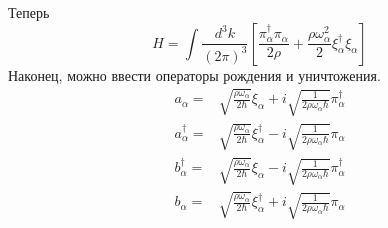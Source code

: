 \documentclass{article}
\begin{document}
Теперь
\begin{equation}
    H = \int \frac{d^3 k}{(2\pi)^3} \left[ \frac{\pi_\alpha^\dagger \pi_\alpha}{2\rho} + 
                         \frac{\rho \omega_\alpha^2}{2} \xi_\alpha^\dagger \xi_\alpha
                                        \right]
\end{equation}
Наконец, можно ввести операторы рождения и уничтожения.
\begin{equation}
    \begin{split}
        a_{\alpha} = & \sqrt{\frac{\rho \omega_\alpha}{2\hbar}}\xi_\alpha + 
                        i\sqrt{\frac{1}{2\rho\omega_\alpha \hbar}}\pi_\alpha^\dagger\\
        a_{\alpha}^\dagger = & \sqrt{\frac{\rho \omega_\alpha}{2\hbar}}\xi_\alpha^\dagger - 
                        i\sqrt{\frac{1}{2\rho\omega_\alpha \hbar}}\pi_\alpha\\
        b_{\alpha}^\dagger= & \sqrt{\frac{\rho \omega_\alpha}{2\hbar}}\xi_\alpha - 
                        i\sqrt{\frac{1}{2\rho\omega_\alpha \hbar}}\pi_\alpha^\dagger\\
        b_{\alpha} = & \sqrt{\frac{\rho \omega_\alpha}{2\hbar}}\xi_\alpha^\dagger + 
                        i\sqrt{\frac{1}{2\rho\omega_\alpha \hbar}}\pi_\alpha\\
    \end{split}
\end{equation}
\end{document}
